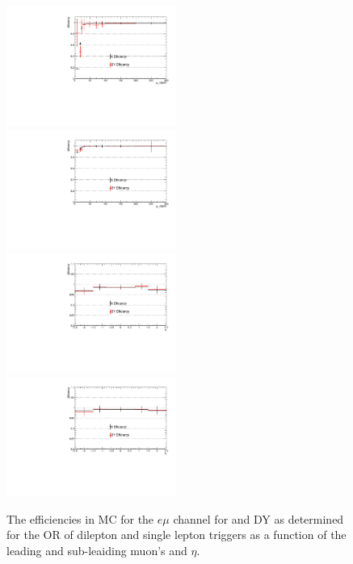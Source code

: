 \begin{figure}[ht]
\centering
\includegraphics[width=0.495\textwidth]{figs/background-estimation/triggerEfficiency/DY/muon1_pT_eff.pdf}
\includegraphics[width=0.495\textwidth]{figs/background-estimation/triggerEfficiency/DY/muon2_pT_eff.pdf}
\\
\includegraphics[width=0.495\textwidth]{figs/background-estimation/triggerEfficiency/DY/muon1_eta_eff.pdf}
\includegraphics[width=0.495\textwidth]{figs/background-estimation/triggerEfficiency/DY/muon2_eta_eff.pdf}
\caption{
The efficiencies in MC for the $e\mu$ channel for \ttbar and DY as determined for the OR of dilepton and single lepton triggers as a function of the leading and sub-leaiding muon's \pT and $\eta$.
}
\label{fig:App_trigSyst_mumu}
\end{figure}

